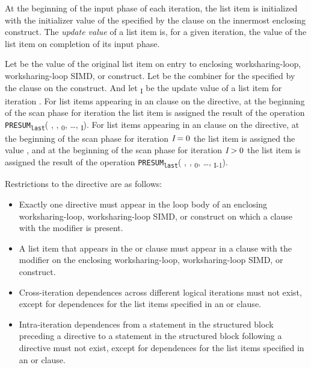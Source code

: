 At the beginning of the input phase of each iteration, the list item is
initialized with the initializer value of the 
specified by the  clause on the innermost enclosing construct.
The \textit{update value} of a list item is, for a given iteration, the value
of the list item on completion of its input phase. 

Let  be the value of the original list item on entry to
enclosing worksharing-loop, worksharing-loop SIMD, or  construct. Let  be the
combiner for the  specified by the 
clause on the construct. And let \textsubscript{I} be the update value
of a list item for iteration .  For list items appearing in an
 clause on the  directive, at the beginning of the
scan phase for iteration  the list item is assigned the result of the
operation \texttt{PRESUM\textsubscript{last}}( , ,
\textsubscript{0}, \ldots, \textsubscript{I}).  For list items
appearing in an  clause on the  directive, at the
beginning of the scan phase for iteration $\plc{I} = 0$  the list item is
assigned the value , and at the beginning of the scan phase for
iteration $\plc{I} > 0$  the list item is assigned the result of the operation
\texttt{PRESUM\textsubscript{last}}( , ,
\textsubscript{0}, \ldots, \textsubscript{I-1}).


\restrictions
Restrictions to the  directive are as follows:

\begin{itemize}

\item Exactly one  directive must appear in the loop body of an
    enclosing worksharing-loop, worksharing-loop SIMD, or  construct on which a
     clause with the  modifier is present.

\item A list item that appears in the  or 
    clause must appear in a  clause with the 
    modifier on the enclosing worksharing-loop, worksharing-loop SIMD, or  construct.

\item Cross-iteration dependences across different logical iterations must not
    exist, except for dependences for the list items specified in an
     or  clause.

\item Intra-iteration dependences from a statement in the structured block
    preceding a  directive to a statement in the structured block
    following a  directive must not exist, except for dependences
    for the list items specified in an  or 
    clause.

\end{itemize}

